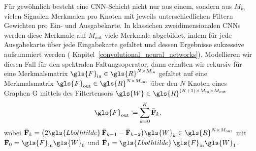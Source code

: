 Für gewöhnlich besteht eine \gls{CNN}-Schicht nicht nur aus einem, sondern aus $M_{\mathrm{in}}$ vielen Signalen \bzw{} Merkmalen pro Knoten mit jeweils unterschiedlichen Filtern \bzw{} Gewichten pro Ein- und Ausgabekarte.
In klassichen zweidimensionalen \glspl{CNN} werden diese Merkmale auf $M_{\mathrm{out}}$ viele Merkmale abgebildet, indem für jede Ausgabekarte über jede Eingabekarte gefaltet und dessen Ergebnisse sukzessive aufsummiert werden (\vgl{} Kapitel~\ref{convolutional_neural_networks}).
Modellieren wir diesen Fall für den spektralen Faltungsoperator, dann erhalten wir rekursiv für eine Merkmalsmatrix $\gls{F}_{\mathrm{in}} \in \gls{R}^{N \times M_{\mathrm{in}}}$ gefaltet auf eine Merkmalsmatrix $\gls{F}_{\mathrm{out}} \in \gls{R}^{N \times M_{\mathrm{out}}}$ über den $N$ Knoten eines Graphen \gls{G} mittels des Filtertensors $\gls{W} \in \gls{R}^{\left(K+1\right) \times M_{\mathrm{in}} \times M_{\mathrm{out}}}$
\begin{equation*}
  \gls{F}_{\mathrm{out}} \coloneqq \sum_{k=0}^K \ma{\bar F}_k,
\end{equation*}
wobei $\ma{\bar F}_k = \left(2\gls{Lbothtilde}\,\ma{\bar F}_{k -1} -  \ma{\bar F}_{k - 2}\right)\gls{W}_k \in \gls{R}^{N \times M_{\mathrm{out}}}$ mit $\ma{\bar F}_0 = \gls{F}_{\mathrm{in}}\gls{W}_0$ und $\ma{\bar F}_1 = \gls{Lbothtilde}\,\gls{F}_{\mathrm{in}}\gls{W}_1$.
